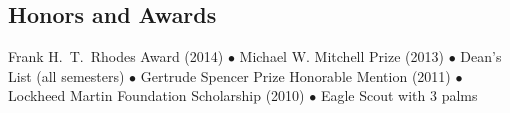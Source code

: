 

\subsection*{Honors and Awards}

Frank H.\ T.\ Rhodes Award (2014) $\bullet$ Michael W. Mitchell Prize (2013) $\bullet$ Dean's List (all semesters) $\bullet$ Gertrude Spencer Prize Honorable Mention (2011) $\bullet$ Lockheed Martin Foundation Scholarship (2010) $\bullet$ Eagle Scout with 3 palms
